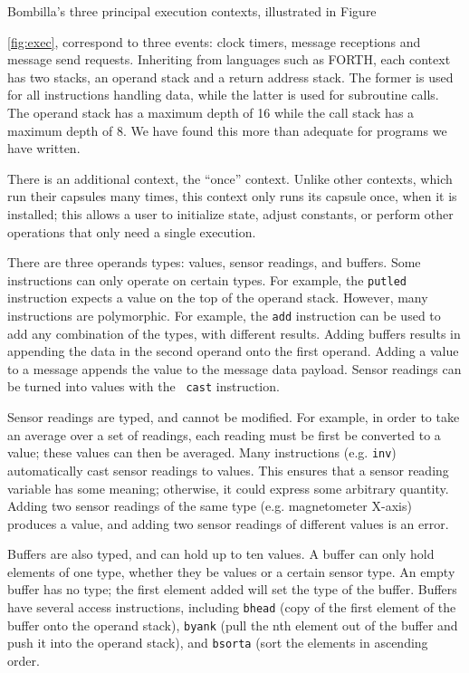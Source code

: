 \documentclass[10pt]{article}
\newcommand{\bomb}{Bombilla\xspace}
\begin{document}
\bomb's three principal execution contexts, illustrated in Figure

\ref{fig:exec}, correspond to three events: clock timers, message
receptions and message send requests.  Inheriting from languages such
as FORTH, each context has two stacks, an operand stack and a return
address stack. The former is used for all instructions handling data,
while the latter is used for subroutine calls. The operand stack has a
maximum depth of 16 while the call stack has a maximum depth of 8. We
have found this more than adequate for programs we have written.

There is an additional context, the ``once'' context. Unlike other
contexts, which run their capsules many times, this context only runs
its capsule once, when it is installed; this allows a user to
initialize state, adjust constants, or perform other operations that
only need a single execution.

There are three operands types: values, sensor readings, and
buffers. Some instructions can only operate on certain types. For
example, the {\tt putled} instruction expects a value on the top of
the operand stack. However, many instructions are polymorphic. For
example, the {\tt add} instruction can be used to add any combination
of the types, with different results. Adding buffers results in
appending the data in the second operand onto the first
operand. Adding a value to a message appends the value to the message
data payload. Sensor readings can be turned into values with the {\tt
cast} instruction.

Sensor readings are typed, and cannot be modified. For example, in
order to take an average over a set of readings, each reading must be
first be converted to a value; these values can then be averaged. Many
instructions (e.g. {\tt inv}) automatically cast sensor readings to
values. This ensures that a sensor reading variable has some meaning;
otherwise, it could express some arbitrary quantity. Adding two sensor
readings of the same type (e.g. magnetometer X-axis) produces a value,
and adding two sensor readings of different values is an error.

Buffers are also typed, and can hold up to ten values. A buffer can
only hold elements of one type, whether they be values or a certain
sensor type. An empty buffer has no type; the first element added will
set the type of the buffer. Buffers have several access instructions,
including {\tt bhead} (copy of the first element of the buffer onto
the operand stack), {\tt byank} (pull the nth element out of the
buffer and push it into the operand stack), and {\tt bsorta} (sort the
elements in ascending order.
\end{document}
